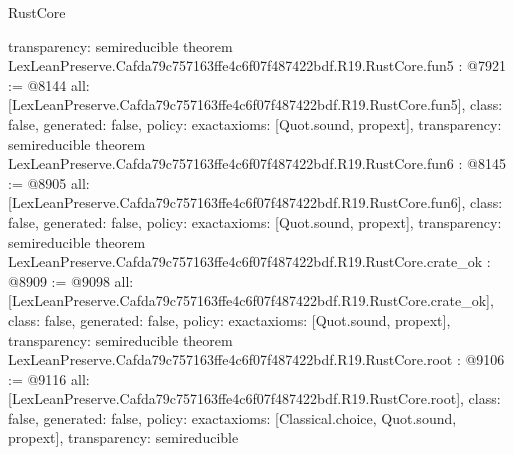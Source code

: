 \begin{lexlean}{RustCore}
\begin{coremodule}
{  transparency: semireducible
}
theorem LexLeanPreserve.Cafda79c757163ffe4c6f07f487422bdf.R19.RustCore.fun5 : @7921 := @8144 {
  all: [LexLeanPreserve.Cafda79c757163ffe4c6f07f487422bdf.R19.RustCore.fun5],
  class: false,
  generated: false,
  policy: exact{axioms: [Quot.sound, propext]},
  transparency: semireducible
}
theorem LexLeanPreserve.Cafda79c757163ffe4c6f07f487422bdf.R19.RustCore.fun6 : @8145 := @8905 {
  all: [LexLeanPreserve.Cafda79c757163ffe4c6f07f487422bdf.R19.RustCore.fun6],
  class: false,
  generated: false,
  policy: exact{axioms: [Quot.sound, propext]},
  transparency: semireducible
}
theorem LexLeanPreserve.Cafda79c757163ffe4c6f07f487422bdf.R19.RustCore.crate_ok : @8909 := @9098 {
  all: [LexLeanPreserve.Cafda79c757163ffe4c6f07f487422bdf.R19.RustCore.crate_ok],
  class: false,
  generated: false,
  policy: exact{axioms: [Quot.sound, propext]},
  transparency: semireducible
}
theorem LexLeanPreserve.Cafda79c757163ffe4c6f07f487422bdf.R19.RustCore.root : @9106 := @9116 {
  all: [LexLeanPreserve.Cafda79c757163ffe4c6f07f487422bdf.R19.RustCore.root],
  class: false,
  generated: false,
  policy: exact{axioms: [Classical.choice, Quot.sound, propext]},
  transparency: semireducible
}


\end{coremodule}
\end{lexlean}
